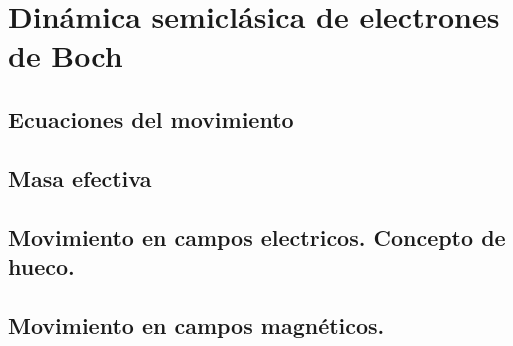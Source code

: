 \chapter{Dinámica semiclásica de electrones de Boch} \label{Ch:08}

\section{Ecuaciones del movimiento}
\section{Masa efectiva}
\section{Movimiento en campos electricos. Concepto de hueco.}
\section{Movimiento en campos magnéticos.}